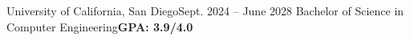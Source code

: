 \resumeSubHeadingListStart
  \resumeSubheading
    {University of California, San Diego}{Sept. 2024 -- June 2028}
    {Bachelor of Science in Computer Engineering}{\textbf{GPA: 3.9/4.0}}
  \resumeItemListStart
      \vspace{-5pt}
  \resumeItemListEnd
\resumeSubHeadingListEnd
